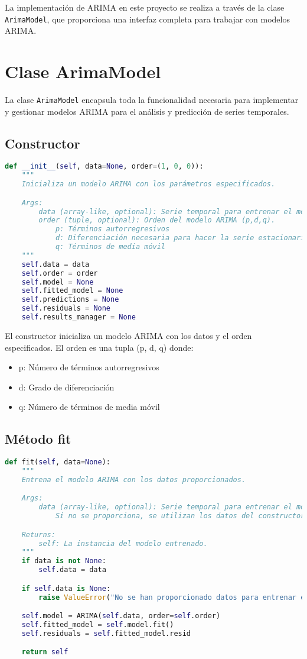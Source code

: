 \documentclass[12pt,letterpaper]{report}
\begin{document}
La implementación de ARIMA en este proyecto se realiza a través de la clase \texttt{ArimaModel}, que proporciona una interfaz completa para trabajar con modelos ARIMA.

\section{Clase ArimaModel}
La clase \texttt{ArimaModel} encapsula toda la funcionalidad necesaria para implementar y gestionar modelos ARIMA para el análisis y predicción de series temporales.

\subsection{Constructor}
\begin{lstlisting}[language=python]
def __init__(self, data=None, order=(1, 0, 0)):
    """
    Inicializa un modelo ARIMA con los parámetros especificados.

    Args:
        data (array-like, optional): Serie temporal para entrenar el modelo.
        order (tuple, optional): Orden del modelo ARIMA (p,d,q).
            p: Términos autorregresivos
            d: Diferenciación necesaria para hacer la serie estacionaria
            q: Términos de media móvil
    """
    self.data = data
    self.order = order
    self.model = None
    self.fitted_model = None
    self.predictions = None
    self.residuals = None
    self.results_manager = None
\end{lstlisting}

El constructor inicializa un modelo ARIMA con los datos y el orden especificados. El orden es una tupla (p, d, q) donde:
\begin{itemize}
    \item p: Número de términos autorregresivos
    \item d: Grado de diferenciación
    \item q: Número de términos de media móvil
\end{itemize}

\subsection{Método fit}
\begin{lstlisting}[language=python]
def fit(self, data=None):
    """
    Entrena el modelo ARIMA con los datos proporcionados.

    Args:
        data (array-like, optional): Serie temporal para entrenar el modelo.
            Si no se proporciona, se utilizan los datos del constructor.

    Returns:
        self: La instancia del modelo entrenado.
    """
    if data is not None:
        self.data = data

    if self.data is None:
        raise ValueError("No se han proporcionado datos para entrenar el modelo")

    self.model = ARIMA(self.data, order=self.order)
    self.fitted_model = self.model.fit()
    self.residuals = self.fitted_model.resid

    return self
\end{lstlisting}
\end{document}
